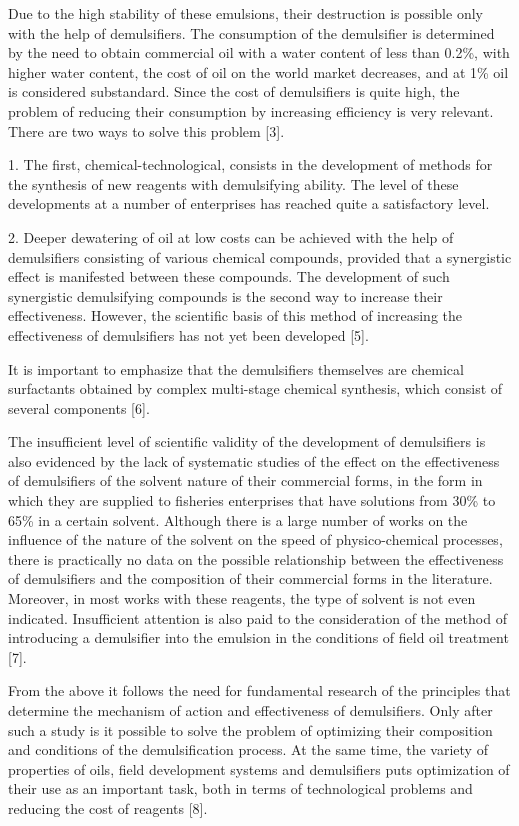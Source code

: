 \begin{multicols}{2}
Due to the high stability of these emulsions, their destruction is
possible only with the help of demulsifiers. The consumption of the
demulsifier is determined by the need to obtain commercial oil with a
water content of less than 0.2\%, with higher water content, the cost of
oil on the world market decreases, and at 1\% oil is considered
substandard. Since the cost of demulsifiers is quite high, the problem
of reducing their consumption by increasing efficiency is very relevant.
There are two ways to solve this problem {[}3{]}.

1. The first, chemical-technological, consists in the development of
methods for the synthesis of new reagents with demulsifying ability. The
level of these developments at a number of enterprises has reached quite
a satisfactory level.

2. Deeper dewatering of oil at low costs can be achieved with the help
of demulsifiers consisting of various chemical compounds, provided that
a synergistic effect is manifested between these compounds. The
development of such synergistic demulsifying compounds is the second way
to increase their effectiveness. However, the scientific basis of this
method of increasing the effectiveness of demulsifiers has not yet been
developed {[}5{]}.

It is important to emphasize that the demulsifiers themselves are
chemical surfactants obtained by complex multi-stage chemical synthesis,
which consist of several components {[}6{]}.

The insufficient level of scientific validity of the development of
demulsifiers is also evidenced by the lack of systematic studies of the
effect on the effectiveness of demulsifiers of the solvent nature of
their commercial forms, in the form in which they are supplied to
fisheries enterprises that have solutions from 30\% to 65\% in a certain
solvent. Although there is a large number of works on the influence of
the nature of the solvent on the speed of physico-chemical processes,
there is practically no data on the possible relationship between the
effectiveness of demulsifiers and the composition of their commercial
forms in the literature. Moreover, in most works with these reagents,
the type of solvent is not even indicated. Insufficient attention is
also paid to the consideration of the method of introducing a
demulsifier into the emulsion in the conditions of field oil treatment
{[}7{]}.

From the above it follows the need for fundamental research of the
principles that determine the mechanism of action and effectiveness of
demulsifiers. Only after such a study is it possible to solve the
problem of optimizing their composition and conditions of the
demulsification process. At the same time, the variety of properties of
oils, field development systems and demulsifiers puts optimization of
their use as an important task, both in terms of technological problems
and reducing the cost of reagents {[}8{]}.


\end{multicols}
